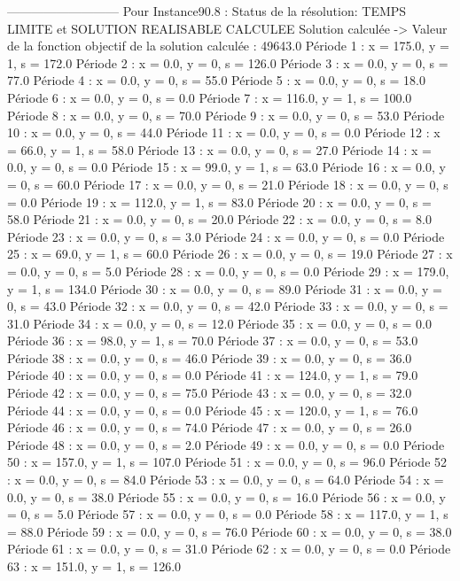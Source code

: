 ---------------------------
Pour Instance90.8  :
Status de la résolution: TEMPS LIMITE et SOLUTION REALISABLE CALCULEE
Solution calculée
-> Valeur de la fonction objectif de la solution calculée :  49643.0
Période 1 : x = 175.0, y = 1, s = 172.0
Période 2 : x = 0.0, y = 0, s = 126.0
Période 3 : x = 0.0, y = 0, s = 77.0
Période 4 : x = 0.0, y = 0, s = 55.0
Période 5 : x = 0.0, y = 0, s = 18.0
Période 6 : x = 0.0, y = 0, s = 0.0
Période 7 : x = 116.0, y = 1, s = 100.0
Période 8 : x = 0.0, y = 0, s = 70.0
Période 9 : x = 0.0, y = 0, s = 53.0
Période 10 : x = 0.0, y = 0, s = 44.0
Période 11 : x = 0.0, y = 0, s = 0.0
Période 12 : x = 66.0, y = 1, s = 58.0
Période 13 : x = 0.0, y = 0, s = 27.0
Période 14 : x = 0.0, y = 0, s = 0.0
Période 15 : x = 99.0, y = 1, s = 63.0
Période 16 : x = 0.0, y = 0, s = 60.0
Période 17 : x = 0.0, y = 0, s = 21.0
Période 18 : x = 0.0, y = 0, s = 0.0
Période 19 : x = 112.0, y = 1, s = 83.0
Période 20 : x = 0.0, y = 0, s = 58.0
Période 21 : x = 0.0, y = 0, s = 20.0
Période 22 : x = 0.0, y = 0, s = 8.0
Période 23 : x = 0.0, y = 0, s = 3.0
Période 24 : x = 0.0, y = 0, s = 0.0
Période 25 : x = 69.0, y = 1, s = 60.0
Période 26 : x = 0.0, y = 0, s = 19.0
Période 27 : x = 0.0, y = 0, s = 5.0
Période 28 : x = 0.0, y = 0, s = 0.0
Période 29 : x = 179.0, y = 1, s = 134.0
Période 30 : x = 0.0, y = 0, s = 89.0
Période 31 : x = 0.0, y = 0, s = 43.0
Période 32 : x = 0.0, y = 0, s = 42.0
Période 33 : x = 0.0, y = 0, s = 31.0
Période 34 : x = 0.0, y = 0, s = 12.0
Période 35 : x = 0.0, y = 0, s = 0.0
Période 36 : x = 98.0, y = 1, s = 70.0
Période 37 : x = 0.0, y = 0, s = 53.0
Période 38 : x = 0.0, y = 0, s = 46.0
Période 39 : x = 0.0, y = 0, s = 36.0
Période 40 : x = 0.0, y = 0, s = 0.0
Période 41 : x = 124.0, y = 1, s = 79.0
Période 42 : x = 0.0, y = 0, s = 75.0
Période 43 : x = 0.0, y = 0, s = 32.0
Période 44 : x = 0.0, y = 0, s = 0.0
Période 45 : x = 120.0, y = 1, s = 76.0
Période 46 : x = 0.0, y = 0, s = 74.0
Période 47 : x = 0.0, y = 0, s = 26.0
Période 48 : x = 0.0, y = 0, s = 2.0
Période 49 : x = 0.0, y = 0, s = 0.0
Période 50 : x = 157.0, y = 1, s = 107.0
Période 51 : x = 0.0, y = 0, s = 96.0
Période 52 : x = 0.0, y = 0, s = 84.0
Période 53 : x = 0.0, y = 0, s = 64.0
Période 54 : x = 0.0, y = 0, s = 38.0
Période 55 : x = 0.0, y = 0, s = 16.0
Période 56 : x = 0.0, y = 0, s = 5.0
Période 57 : x = 0.0, y = 0, s = 0.0
Période 58 : x = 117.0, y = 1, s = 88.0
Période 59 : x = 0.0, y = 0, s = 76.0
Période 60 : x = 0.0, y = 0, s = 38.0
Période 61 : x = 0.0, y = 0, s = 31.0
Période 62 : x = 0.0, y = 0, s = 0.0
Période 63 : x = 151.0, y = 1, s = 126.0
